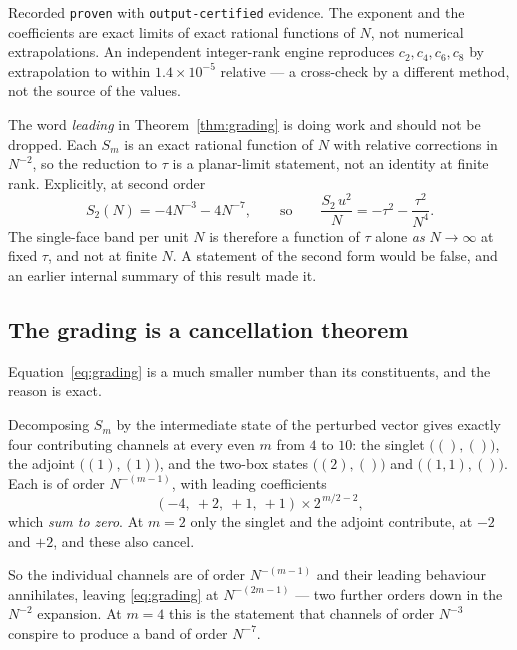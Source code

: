 \noindent Recorded \texttt{proven} with \texttt{output-certified}
evidence. The exponent and the coefficients are exact limits of exact
rational functions of $N$, not numerical extrapolations. An independent
integer-rank engine reproduces $c_2, c_4, c_6, c_8$ by extrapolation to
within $1.4 \times 10^{-5}$ relative --- a cross-check by a different
method, not the source of the values.

The word \emph{leading} in Theorem~\ref{thm:grading} is doing work and
should not be dropped. Each $S_m$ is an exact rational function of $N$
with relative corrections in $N^{-2}$, so the reduction to $\tau$ is a
planar-limit statement, not an identity at finite rank. Explicitly, at
second order
\begin{equation}
  S_2(N) = -4N^{-3} - 4N^{-7},
  \qquad\text{so}\qquad
  \frac{S_2\,u^2}{N} = -\tau^2 - \frac{\tau^2}{N^4}.
\end{equation}
The single-face band per unit $N$ is therefore a function of $\tau$
alone \emph{as} $N \to \infty$ at fixed $\tau$, and not at finite $N$.
A statement of the second form would be false, and an earlier internal
summary of this result made it.

\subsection{The grading is a cancellation theorem}

Equation~\eqref{eq:grading} is a much smaller number than its
constituents, and the reason is exact.

\begin{theorem}
\label{thm:cancellation}
Decomposing $S_m$ by the intermediate state of the perturbed vector
gives exactly four contributing channels at every even $m$ from $4$ to
$10$: the singlet $\big((),()\big)$, the adjoint
$\big((1),(1)\big)$, and the two-box states $\big((2),()\big)$ and
$\big((1,1),()\big)$. Each is of order $N^{-(m-1)}$, with leading
coefficients
\begin{equation}
  (-4,\ +2,\ +1,\ +1) \times 2^{\,m/2-2},
\end{equation}
which \emph{sum to zero}. At $m = 2$ only the singlet and the adjoint
contribute, at $-2$ and $+2$, and these also cancel.
\end{theorem}

So the individual channels are of order $N^{-(m-1)}$ and their leading
behaviour annihilates, leaving \eqref{eq:grading} at $N^{-(2m-1)}$ ---
two further orders down in the $N^{-2}$ expansion. At $m = 4$ this is
the statement that channels of order $N^{-3}$ conspire to produce a band
of order $N^{-7}$.

